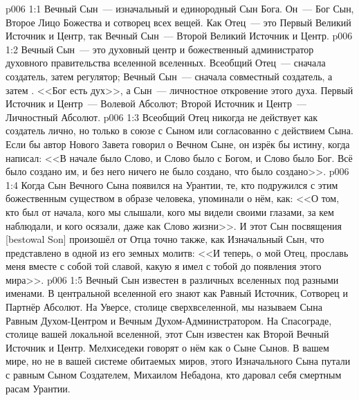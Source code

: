 \vs p006 1:1 Вечный Сын~--- изначальный и единородный Сын Бога. Он~--- Бог Сын, Второе Лицо Божества и сотворец всех вещей. Как Отец~--- это Первый Великий Источник и Центр, так Вечный Сын~--- Второй Великий Источник и Центр.
\vs p006 1:2 Вечный Сын~--- это духовный центр и божественный администратор духовного правительства вселенной вселенных. Всеобщий Отец~--- сначала создатель, затем регулятор; Вечный Сын~--- сначала совместный создатель, а затем . <<Бог есть дух>>, а Сын~--- личностное откровение этого духа. Первый Источник и Центр~--- Волевой Абсолют; Второй Источник и Центр~--- Личностный Абсолют.
\vs p006 1:3 Всеобщий Отец никогда не действует как создатель лично, но только в союзе с Сыном или согласованно с действием Сына. Если бы автор Нового Завета говорил о Вечном Сыне, он изрёк бы истину, когда написал: <<В начале было Слово, и Слово было с Богом, и Слово было Бог. Всё было создано им, и без него ничего не было создано, что было создано>>.
\vs p006 1:4 Когда Сын Вечного Сына появился на Урантии, те, кто подружился с этим божественным существом в образе человека, упоминали о нём, как: <<О том, кто был от начала, кого мы слышали, кого мы видели своими глазами, за кем наблюдали, и кого осязали, даже как Слово жизни>>. И этот Сын посвящения [bestowal Son] произошёл от Отца точно также, как Изначальный Сын, что представлено в одной из его земных молитв: <<И теперь, о мой Отец, прославь меня вместе с собой той славой, какую я имел с тобой до появления этого мира>>.
\vs p006 1:5 \pc Вечный Сын известен в различных вселенных под разными именами. В центральной вселенной его знают как Равный Источник, Сотворец и Партнёр Абсолют. На Уверсе, столице сверхвселенной, мы называем Сына Равным Духом\hyp{}Центром и Вечным Духом\hyp{}Администратором. На Спасограде, столице вашей локальной вселенной, этот Сын известен как Второй Вечный Источник и Центр. Мелхиседеки говорят о нём как о Сыне Сынов. В вашем мире, но не в вашей системе обитаемых миров, этого Изначального Сына путали с равным Сыном Создателем, Михаилом Небадона, кто даровал себя смертным расам Урантии.
